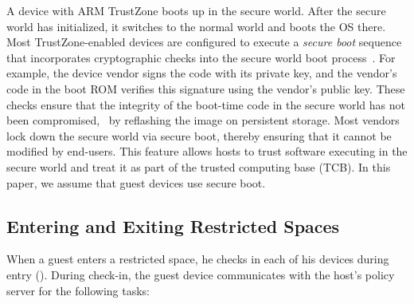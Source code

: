 A device with ARM TrustZone boots up in the secure world. After the secure
world has initialized, it switches to the normal world and boots the OS there.
Most TrustZone-enabled devices are configured to execute a \textit{secure boot}
sequence that incorporates cryptographic checks into the secure world boot
process~\cite[\S5.2.2]{armtz}. For example, the device vendor signs the code
with its private key, and the vendor's code in the boot ROM verifies this
signature using the vendor's public key. These checks ensure that the integrity
of the boot-time code in the secure world has not been compromised, \eg~by
reflashing the image on persistent storage. Most vendors lock down the secure
world via secure boot, thereby ensuring that it cannot be modified by
end-users. This feature allows hosts to trust software executing in the secure
world and treat it as part of the trusted computing base (TCB). In this paper,
we assume that guest devices use secure boot.

\subsection{Entering and Exiting Restricted Spaces}
\label{section:usagemodel:checkin}

 When a guest enters a restricted space, he checks in
each of his devices during entry ().  During
check-in, the guest device communicates with the host's policy server for the
following tasks:

